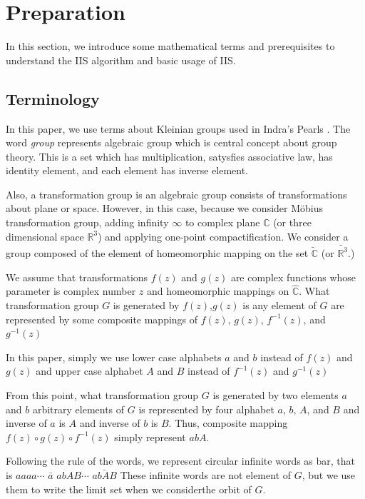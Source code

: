 
\section{Preparation}

In this section, we introduce some mathematical terms and prerequisites
to understand the IIS algorithm and basic usage of IIS.

\subsection{Terminology}

In this paper, we use terms about Kleinian groups used in Indra's
Pearls \cite{MumfordSeriesWright200204}.
The word \textit{group} represents algebraic group which is 
central concept about group theory.
This is a set which has
multiplication, satysfies associative law, has identity element, and
each element has inverse element.

Also, a transformation group is an algebraic group consists of
transformations about plane or space.
However, in this case, because we consider M\"obius transformation group,
adding infinity $\infty$ to complex plane $\mathbb{C}$ (or three
dimensional space $\mathbb{R}^3$) and applying one-point compactification.
We consider a group composed of the element of homeomorphic mapping on
the set $\tilde{ \mathbb{C}}$ (or $\tilde{ \mathbb{R}^3 }$.)

We assume that transformations $f(z)$ and $g(z)$ are complex functions
whose parameter is complex number $z$
and homeomorphic mappings on $\hat{\mathbb{C}}$.
What transformation group $G$ is generated by $f(z)$,$g(z)$
is any element of $G$ are represented by some composite mappings of $f(z)$,
$g(z)$, $f^{-1}(z)$, and $g^{-1}(z)$

In this paper, simply we use 
lower case alphabets $a$ and $b$ instead of $f(z)$ and $g(z)$ and
upper case alphabet $A$ and $B$ instead of $f^{-1}(z)$ and $g^{-1}(z)$

From this point, what transformation group $G$ is generated by two
elements $a$ and $b$ arbitrary elements of $G$ is represented by
four alphabet $a$, $b$, $A$, and $B$ and inverse of $a$ is $A$ and
inverse of $b$ is $B$.
Thus, composite mapping $f(z)\circ g(z) \circ f^{-1}(z)$ simply
represent $abA$.

Following the rule of the words, we represent circular infinite words as
bar, that is $aaaa\cdots$ $\bar a$ $abAB \cdots$ $\bar{abAB}$
These infinite words are not element of $G$, but we use 
them to write the limit set when we considerthe orbit of $G$.

